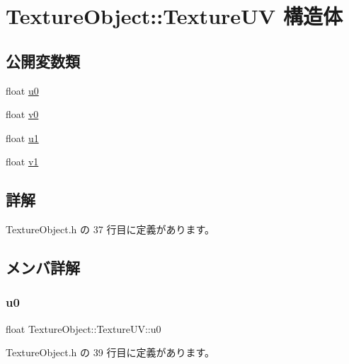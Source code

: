 \hypertarget{struct_texture_object_1_1_texture_u_v}{}\section{Texture\+Object\+:\+:Texture\+UV 構造体}
\label{struct_texture_object_1_1_texture_u_v}
\subsection*{公開変数類}
\begin{DoxyCompactItemize}
\item 
float \mbox{\hyperlink{struct_texture_object_1_1_texture_u_v_a84b3efc1cb81d83186292b7be4a0d8d2}{u0}}
\item 
float \mbox{\hyperlink{struct_texture_object_1_1_texture_u_v_a6d618913a04e1b2d0a9d4b59a6acb070}{v0}}
\item 
float \mbox{\hyperlink{struct_texture_object_1_1_texture_u_v_acf1faf5c49d1a7b0c084d44b1984f4d2}{u1}}
\item 
float \mbox{\hyperlink{struct_texture_object_1_1_texture_u_v_a643c63637820897999d0fa658f85584c}{v1}}
\end{DoxyCompactItemize}


\subsection{詳解}


 Texture\+Object.\+h の 37 行目に定義があります。



\subsection{メンバ詳解}
\mbox{\label{struct_texture_object_1_1_texture_u_v_a84b3efc1cb81d83186292b7be4a0d8d2}} 
\subsubsection{\texorpdfstring{u0}{u0}}
{\footnotesize\ttfamily float Texture\+Object\+::\+Texture\+U\+V\+::u0}



 Texture\+Object.\+h の 39 行目に定義があります。

